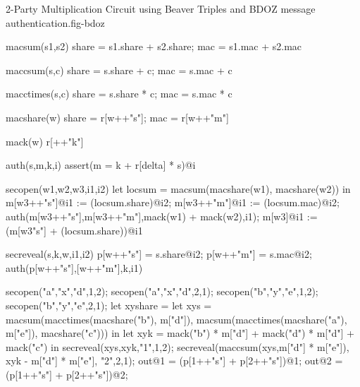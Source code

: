 \begin{fpfig}[t]{2-Party Multiplication Circuit using Beaver Triples and BDOZ message authentication.}{fig-bdoz}
{\footnotesize
  \begin{verbatimtab}
    macsum(s1,s2)
    { { share = s1.share + s2.share; mac = s1.mac + s2.mac } }
    
    maccsum(s,c)
    { { share = s.share + c; mac = s.mac + c } }
    
    macctimes(s,c)
    { { share = s.share * c; mac = s.mac * c } }
    
    macshare(w) { {  share = r[w++"s"]; mac = r[w++"m"] } }

    mack(w) { r[++"k"] }
    
    auth(s,m,k,i) { assert(m = k + r[delta] * s)@i }
    
    secopen(w1,w2,w3,i1,i2)
    {
      let locsum =  macsum(macshare(w1), macshare(w2)) in
      m[w3++"s"]@i1 := (locsum.share)@i2;
      m[w3++"m"]@i1 := (locsum.mac)@i2;
      auth(m[w3++"s"],m[w3++"m"],mack(w1) + mack(w2),i1);
      m[w3]@i1 := (m[w3"s"] + (locsum.share))@i1
    }

    secreveal(s,k,w,i1,i2)
    {
      p[w++"s"] = s.share@i2;
      p[w++"m"] = s.mac@i2;
      auth(p[w++"s"],[w++"m"],k,i1)    
    }

    secopen("a","x","d",1,2);
    secopen("a","x","d",2,1);
    secopen("b","y","e",1,2);
    secopen("b","y","e",2,1);
    let xyshare = 
    let xys =
      macsum(macctimes(macshare("b"), m["d"]),
             macsum(macctimes(macshare("a"), m["e"]),
                    macshare("c")))
    in
    let xyk = mack("b") * m["d"] + mack("d") * m["d"] + mack("c")               
    in
    secreveal(xys,xyk,"1",1,2);
    secreveal(maccsum(xys,m["d"] * m["e"]),
              xyk - m["d"] * m["e"],
              "2",2,1);
    out@1 = (p[1++"s"] + p[2++"s"])@1;
    out@2 = (p[1++"s"] + p[2++"s"])@2;
  \end{verbatimtab}
}
\end{fpfig}

    
